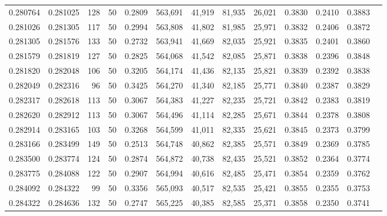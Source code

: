 \begin{tabular}{rrrrrrrrrrrrr}
0.280764 & 0.281025 &   128 &  50 &                                     0.2809 & 563,691 &  41,919 &  81,935 &  26,021 & 0.3830 & 0.2410 & 0.3883 \\
0.281026 & 0.281305 &   117 &  50 &                                     0.2994 & 563,808 &  41,802 &  81,985 &  25,971 & 0.3832 & 0.2406 & 0.3872 \\
0.281305 & 0.281576 &   133 &  50 &                                     0.2732 & 563,941 &  41,669 &  82,035 &  25,921 & 0.3835 & 0.2401 & 0.3860 \\
0.281579 & 0.281819 &   127 &  50 &                                     0.2825 & 564,068 &  41,542 &  82,085 &  25,871 & 0.3838 & 0.2396 & 0.3848 \\
0.281820 & 0.282048 &   106 &  50 &                                     0.3205 & 564,174 &  41,436 &  82,135 &  25,821 & 0.3839 & 0.2392 & 0.3838 \\
0.282049 & 0.282316 &    96 &  50 &                                     0.3425 & 564,270 &  41,340 &  82,185 &  25,771 & 0.3840 & 0.2387 & 0.3829 \\
0.282317 & 0.282618 &   113 &  50 &                                     0.3067 & 564,383 &  41,227 &  82,235 &  25,721 & 0.3842 & 0.2383 & 0.3819 \\
0.282620 & 0.282912 &   113 &  50 &                                     0.3067 & 564,496 &  41,114 &  82,285 &  25,671 & 0.3844 & 0.2378 & 0.3808 \\
0.282914 & 0.283165 &   103 &  50 &                                     0.3268 & 564,599 &  41,011 &  82,335 &  25,621 & 0.3845 & 0.2373 & 0.3799 \\
0.283166 & 0.283499 &   149 &  50 &                                     0.2513 & 564,748 &  40,862 &  82,385 &  25,571 & 0.3849 & 0.2369 & 0.3785 \\
0.283500 & 0.283774 &   124 &  50 &                                     0.2874 & 564,872 &  40,738 &  82,435 &  25,521 & 0.3852 & 0.2364 & 0.3774 \\
0.283775 & 0.284088 &   122 &  50 &                                     0.2907 & 564,994 &  40,616 &  82,485 &  25,471 & 0.3854 & 0.2359 & 0.3762 \\
0.284092 & 0.284322 &    99 &  50 &                                     0.3356 & 565,093 &  40,517 &  82,535 &  25,421 & 0.3855 & 0.2355 & 0.3753 \\
0.284322 & 0.284636 &   132 &  50 &                                     0.2747 & 565,225 &  40,385 &  82,585 &  25,371 & 0.3858 & 0.2350 & 0.3741 \\

\end{tabular}
